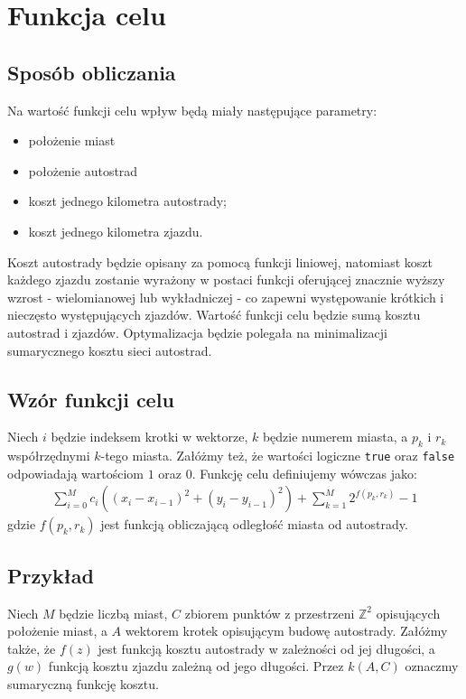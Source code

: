 \documentclass{article}
\begin{document}
\section{Funkcja celu}
\subsection{Sposób obliczania}
Na wartość funkcji celu wpływ będą miały następujące parametry:
\begin{itemize}
\item położenie miast
\item położenie autostrad
\item koszt jednego kilometra autostrady;
\item koszt jednego kilometra zjazdu.
\end{itemize}
Koszt autostrady będzie opisany za pomocą funkcji liniowej, natomiast koszt każdego zjazdu zostanie wyrażony w postaci funkcji oferującej znacznie wyższy wzrost - wielomianowej lub wykładniczej - co zapewni występowanie krótkich i nieczęsto występujących zjazdów. Wartość funkcji celu będzie sumą kosztu autostrad i zjazdów. Optymalizacja będzie polegała na minimalizacji sumarycznego kosztu sieci autostrad.

\subsection{Wzór funkcji celu}
Niech $i$ będzie indeksem krotki w wektorze, $k$ będzie numerem miasta, a $p_k$ i $r_k$ współrzędnymi $k$-tego miasta. Załóżmy też, że wartości logiczne \texttt{true} oraz \texttt{false} odpowiadają wartościom $1$ oraz $0$. Funkcję celu definiujemy wówczas jako:
\begin{align*}
\sum_{i = 0}^{M} c_i((x_i - x_{i-1})^2 + (y_i - y_{i-1})^2) + \sum_{k = 1}^{M} 2^{f(p_k, r_k)} - 1
\end{align*}
gdzie $f(p_k, r_k)$ jest funkcją obliczającą odległość miasta od autostrady.

\subsection{Przykład}
Niech $M$ będzie liczbą miast, $C$ zbiorem punktów z przestrzeni $\mathbb{Z}^{2}$ opisujących położenie miast, a $A$ wektorem krotek opisującym budowę autostrady. Załóżmy także, że $f(z)$ jest funkcją kosztu autostrady w zależności od jej długości, a $g(w)$ funkcją kosztu zjazdu zależną od jego długości. Przez $k(A, C)$ oznaczmy sumaryczną funkcję kosztu.\\
\end{document}
